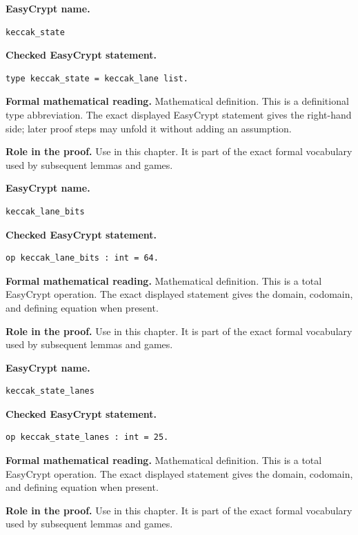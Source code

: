 \begin{formaldefinition}
\noindent\textbf{EasyCrypt name.}
\begin{lstlisting}[language=EasyCrypt,basicstyle=\ttfamily\scriptsize]
keccak_state
\end{lstlisting}
\noindent\textbf{Checked EasyCrypt statement.}
\begin{lstlisting}[language=EasyCrypt,basicstyle=\ttfamily\scriptsize]
type keccak_state = keccak_lane list.
\end{lstlisting}
\noindent\textbf{Formal mathematical reading.}
Mathematical definition. This is a definitional type abbreviation.  The exact displayed EasyCrypt statement gives the right-hand side; later proof steps may unfold it without adding an assumption.

\noindent\textbf{Role in the proof.}
Use in this chapter. It is part of the exact formal vocabulary used by subsequent lemmas and games.

\end{formaldefinition}

\begin{formaldefinition}
\noindent\textbf{EasyCrypt name.}
\begin{lstlisting}[language=EasyCrypt,basicstyle=\ttfamily\scriptsize]
keccak_lane_bits
\end{lstlisting}
\noindent\textbf{Checked EasyCrypt statement.}
\begin{lstlisting}[language=EasyCrypt,basicstyle=\ttfamily\scriptsize]
op keccak_lane_bits : int = 64.
\end{lstlisting}
\noindent\textbf{Formal mathematical reading.}
Mathematical definition. This is a total EasyCrypt operation.  The exact displayed statement gives the domain, codomain, and defining equation when present.

\noindent\textbf{Role in the proof.}
Use in this chapter. It is part of the exact formal vocabulary used by subsequent lemmas and games.

\end{formaldefinition}

\begin{formaldefinition}
\noindent\textbf{EasyCrypt name.}
\begin{lstlisting}[language=EasyCrypt,basicstyle=\ttfamily\scriptsize]
keccak_state_lanes
\end{lstlisting}
\noindent\textbf{Checked EasyCrypt statement.}
\begin{lstlisting}[language=EasyCrypt,basicstyle=\ttfamily\scriptsize]
op keccak_state_lanes : int = 25.
\end{lstlisting}
\noindent\textbf{Formal mathematical reading.}
Mathematical definition. This is a total EasyCrypt operation.  The exact displayed statement gives the domain, codomain, and defining equation when present.

\noindent\textbf{Role in the proof.}
Use in this chapter. It is part of the exact formal vocabulary used by subsequent lemmas and games.

\end{formaldefinition}


